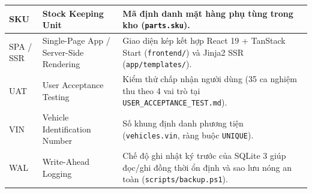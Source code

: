 {\begin{tabularx}{\textwidth}{|L{2.5cm}|L{4.6cm}|Y|}
\hline
SKU & Stock Keeping Unit & Mã định danh mặt hàng phụ tùng trong kho (\texttt{parts.sku}). \\
\hline
SPA / SSR & Single-Page App / Server-Side Rendering & Giao diện kép kết hợp React 19 + TanStack Start (\texttt{frontend/}) và Jinja2 SSR (\texttt{app/templates/}). \\
\hline
UAT & User Acceptance Testing & Kiểm thử chấp nhận người dùng (35 ca nghiệm thu theo 4 vai trò tại \texttt{USER\_ACCEPTANCE\_TEST.md}). \\
\hline
VIN & Vehicle Identification Number & Số khung định danh phương tiện (\texttt{vehicles.vin}, ràng buộc \texttt{UNIQUE}). \\
\hline
WAL & Write-Ahead Logging & Chế độ ghi nhật ký trước của SQLite 3 giúp đọc/ghi đồng thời ổn định và sao lưu nóng an toàn (\texttt{scripts/backup.ps1}). \\
\hline
\end{tabularx}
}
